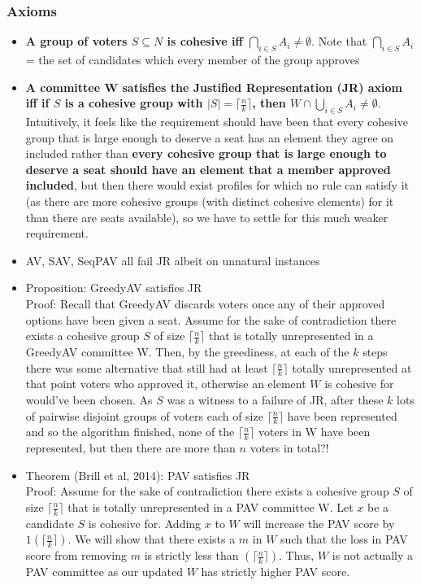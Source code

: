 \documentclass[20pt,a4paper,landscape]{extarticle}
\begin{document}
\begin{flushleft}
\subsubsection{Axioms}
\begin{itemize}
\item \textbf{A group of voters $S \subseteq N$ is cohesive iff $\bigcap_{i \in S} A_i \neq \emptyset$}. Note that $\bigcap_{i \in S} A_i$ = the set of candidates which every member of the group approves
\item \textbf{A committee W satisfies the Justified Representation (JR) axiom iff if $S$ is a cohesive group with $|S| = \lceil \frac{n}{k} \rceil$, then $W \cap \bigcup_{i \in S} A_i \neq \emptyset$}. Intuitively, it feels like the requirement should have been that every cohesive group that is large enough to deserve a seat has an element they agree on included rather than \textbf{every cohesive group that is large enough to deserve a seat should have an element that a member approved included}, but then there would exist profiles for which no rule can satisfy it (as there are more cohesive groups (with distinct cohesive elements) for it than there are seats available), so we have to settle for this much weaker requirement.
\item AV, SAV, SeqPAV all fail JR albeit on unnatural instances
\item Proposition: GreedyAV satisfies JR\\
Proof: Recall that GreedyAV discards voters once any of their approved options have been given a seat. Assume for the sake of contradiction there exists a cohesive group $S$ of size $\lceil \frac{n}{k} \rceil$ that is totally unrepresented in a GreedyAV committee W. Then, by the greediness, at each of the $k$ steps there was some alternative that still had at least $\lceil \frac{n}{k} \rceil$ totally unrepresented at that point voters who approved it, otherwise an element $W$ is cohesive for would've been chosen. As $S$ was a witness to a failure of JR, after these $k$ lots of pairwise disjoint groups of voters each of size $\lceil \frac{n}{k} \rceil$ have been represented and so the algorithm finished, none of the $\lceil \frac{n}{k} \rceil$ voters in W have been represented, but then there are more than $n$ voters in total?!
\clearpage
\item Theorem (Brill et al, 2014): PAV satisfies JR\\
Proof: Assume for the sake of contradiction there exists a cohesive group $S$ of size $\lceil \frac{n}{k} \rceil$ that is totally unrepresented in a PAV committee W. Let $x$ be a candidate $S$ is cohesive for. Adding $x$ to $W$ will increase the PAV score by $1\left(\lceil \frac{n}{k} \rceil\right)$. We will show that there exists a $m$ in $W$ such that the loss in PAV score from removing $m$ is strictly less than $\left(\lceil \frac{n}{k} \rceil\right)$. Thus, $W$ is not actually a PAV committee as our updated $W$ has strictly higher PAV score.\\

\end{itemize}
\end{flushleft}
\end{document}
